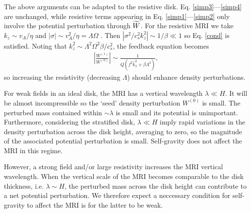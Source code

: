  

 The above arguments can be adapted to the resistive
 disk. Eq. \ref{simp3}---\ref{simp4} are unchanged, while resistive
 terms appearing in Eq. \ref{simp1}---\ref{simp2} only involve the
 potential perturbation through $\widetilde{W}$. For the resistive MRI we take
 $k_z\sim v_A/\eta$ and $|\sigma|\sim v_A^2/\eta = \Lambda\Omega$
 \citep{sano99}. Then $|\sigma^2/c_s^2k_z^2|\sim 1/\beta \ll 1$ so
 Eq. \ref{cond} is satisfied. Noting that $k_z^2\sim
 \Lambda^2\Omega^2\beta/c_s^2$, the feedback equation becomes
 \begin{align}
   \left|\frac{W^{(1)}}{W^{(0)}}\right| \sim
   \frac{1}{Q\left(f^2\hat{k}_x^2 + \beta\Lambda^2\right)},
 \end{align}
 so increasing the resistivity (decreasing $\Lambda$) should enhance
 density perturbations.  


 For weak fields in an ideal disk, the MRI has a vertical
 wavelength $\lambda \ll H$. It will be almost incompressible so the 
 `seed' density perturbation $W^{(0)}$ is small.  
 The perturbed mass contained within 
 $\sim \lambda$ is small and its potential is
 unimportant. Furthermore, considering the stratified  
 disk, $\lambda\ll H$ imply rapid variations in the density
 perturbation across the disk height, averaging to zero, so the
 magnitude of the associated potential perturbation is small. 
 Self-gravity does not affect the MRI in this regime.   
 

 However, a strong field and/or large resistivity increases the MRI
 vertical wavelength. When the vertical scale of the MRI becomes
 comparable to the disk thickness, i.e. $\lambda\sim H$, the
 perturbed mass across the disk height can contribute to a net potential
 perturbation. We therefore expect a neccessary condition for
 self-gravity to affect the MRI is for the latter to be weak. 

